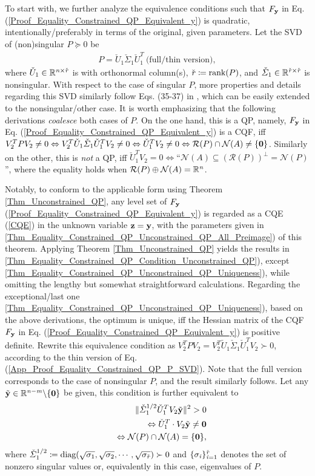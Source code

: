 \documentclass{imaman}
\newcommand{\beq}{\begin{eqnarray}}
\newcommand{\eeq}{\end{eqnarray}}
\newcommand{\bfy}{{\bf y}}
\newcommand{\bfz}{{\bf z}}
\newcommand{\bfzero}{{\bf 0}}
\newcommand{\real}{\mathbb{R}}
\newcommand{\calN}{{\mathcal N}}
\newcommand{\calR}{{\mathcal R}}
\newcommand{\iti}{{\it i}}
\newcommand{\itm}{{\it m}}
\newcommand{\itn}{{\it n}}
\newcommand{\itr}{{\it r}}
\numberwithin{equation}{section}
\begin{document}
To start with, we further analyze the equivalence conditions such that $F_\bfy$ in Eq. (\ref{Proof_Equality_Constrained_QP_Equivalent_y}) is quadratic, intentionally/preferably in terms of the original, given parameters. Let the SVD of (non)singular $P\succeq 0$ be
\beq
P=\check U_1\check\Sigma_1\check U_1^T~\mbox{(full/thin version)},
\label{App_Proof_Equality_Constrained_QP_P_SVD}
\eeq
where $\check U_1\in\real^{{\it n}\times {\check{\it r}}}$ is with orthonormal column(s), $\check\itr\coloneqq\mbox{rank}(P)$, and $\check\Sigma_1\in\real^{{\check\itr}\times {\check\itr}}$ is nonsingular. With respect to the case of singular $P$, more properties and details regarding this SVD similarly follow Eqs. (35-37) in \cite{LiLiHs:20}, which can be easily extended to the nonsingular/other case. It is worth emphasizing that the following derivations \textit{coalesce} both cases of $P$. On the one hand, this is a QP, namely, $F_\bfy$ in Eq. (\ref{Proof_Equality_Constrained_QP_Equivalent_y}) is a CQF, iff $V_2^TPV_2\ne 0\Leftrightarrow V_2^T\check U_1\check \Sigma_1\check U_1^TV_2\ne 0\Leftrightarrow \check U_1^T V_2\ne 0\Leftrightarrow \calR(P)\cap\calN(A)\ne\{\bfzero\}$. Similarly on the other, this is \textit{not} a QP, iff $\check U_1^T V_2=0\Leftrightarrow \mbox{``}\calN(A)\subseteq(\calR(P))^\perp=\calN(P)$'', where the equality holds when $\calR(P)\oplus\calN(A)=\real^\itn$.

Notably, to conform to the applicable form using Theorem \ref{Thm_Unconstrained_QP}, any level set of $F_\bfy$ (\ref{Proof_Equality_Constrained_QP_Equivalent_y}) is regarded as a CQE (\ref{CQE}) in the unknown variable $\bfz=\bfy$, with the parameters given in \ref{Thm_Equality_Constrained_QP_Unconstrained_QP_All_Preimage}) of this theorem. Applying Theorem \ref{Thm_Unconstrained_QP} yields the results in \ref{Thm_Equality_Constrained_QP_Condition_Unconstrained_QP}), except \ref{Thm_Equality_Constrained_QP_Unconstrained_QP_Uniqueness}), while omitting the lengthy but somewhat straightforward calculations. Regarding the exceptional/last one \ref{Thm_Equality_Constrained_QP_Unconstrained_QP_Uniqueness}), based on the above derivations, the optimum is unique, iff the Hessian matrix of the CQF $F_\bfy$ in Eq. (\ref{Proof_Equality_Constrained_QP_Equivalent_y}) is positive definite. Rewrite this equivalence condition as $V_2^TPV_2=V_2^T\check U_1\check\Sigma_1\check U_1^TV_2\succ 0$, according to the thin version of Eq. (\ref{App_Proof_Equality_Constrained_QP_P_SVD}). Note that the full version corresponds to the case of nonsingular $P$, and the result similarly follows. Let any $\tilde\bfy\in\real^{\itn-\itm}\backslash\{\bfzero\}$ be given, this condition is further equivalent to
\beq
&&\Vert\check\Sigma_1^{1/2}\check U_1^TV_2\tilde\bfy\Vert^2>0\nonumber\\
&&\Leftrightarrow\check U_1^T\cdot V_2\tilde\bfy\ne\bfzero\nonumber\\
&&\Leftrightarrow\calN(P)\cap\calN(A)=\{\bfzero\},\nonumber
\eeq
where $\check\Sigma_1^{1/2}\coloneqq\mbox{diag}(\sqrt{\sigma_1},\sqrt{\sigma_2},\cdots,\sqrt{\sigma_{\check\itr}})\succ 0$ and $\{\sigma_\iti\}_{\iti=1}^{\check\itr}$ denotes the set of nonzero singular values or, equivalently in this case, eigenvalues of $P$.
\end{document}
